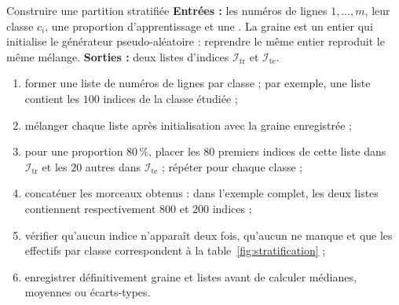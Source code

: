\begin{procedure}{Construire une partition stratifiée}
\textbf{Entrées :} les numéros de lignes $1,\ldots,m$, leur classe $c_i$, une
proportion d'apprentissage et une . La graine est un entier qui
initialise le générateur pseudo-aléatoire : reprendre le même entier reproduit
le même mélange. \textbf{Sorties :} deux listes d'indices
$\mathcal I_{\mathrm{tr}}$ et $\mathcal I_{\mathrm{te}}$.
\begin{enumerate}
  \item former une liste de numéros de lignes par classe ; par exemple, une liste
        contient les $100$ indices de la classe étudiée ;
  \item mélanger chaque liste après initialisation avec la graine enregistrée ;
  \item pour une proportion $80\,\%$, placer les $80$ premiers indices de cette
        liste dans $\mathcal I_{\mathrm{tr}}$ et les $20$ autres dans
        $\mathcal I_{\mathrm{te}}$ ; répéter pour chaque classe ;
  \item concaténer les morceaux obtenus : dans l'exemple complet, les deux listes
        contiennent respectivement $800$ et $200$ indices ;
  \item vérifier qu'aucun indice n'apparaît deux fois, qu'aucun ne manque et que
        les effectifs par classe correspondent à la table~\ref{fig:stratification} ;
  \item enregistrer définitivement graine et listes avant de calculer médianes,
        moyennes ou écarts-types.
\end{enumerate}
\end{procedure}
